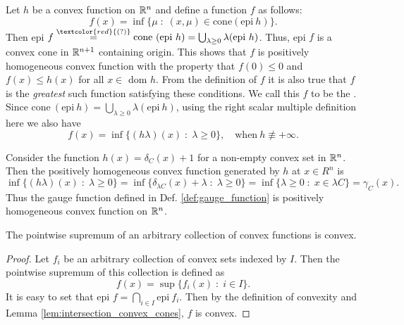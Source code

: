 \documentclass[11pt,a4paper]{article}
\begin{document}
\begin{remark}
    Let $h$ be a convex function on $\mathbb{R}^n$ and define a function $f$ as follows:
    \begin{equation*}
        f(x) = \inf \{\mu\;:\;(x,\mu)\in \mathrm{cone}(\mathrm{epi}\ h)\}.
    \end{equation*}
    Then epi $f \overset{\textcolor{red}{(?)}}{=} \mathrm{cone}\ (\mathrm{epi}\ h) = \bigcup_{\lambda\ge 0} \lambda (\mathrm{epi}\ h)$. Thus, epi $f$ is a convex cone in $\mathbb{R}^{n+1}$ containing origin. This shows that $f$ is positively homogeneous convex function with the property that $f(0)\le 0$ and $f(x)\le h(x)$ for all $x\in$ dom $h$. From the definition of $f$ it is also true that $f$ is the \textit{greatest} such function satisfying these conditions. We call this $f$ to be the . Since $\mathrm{cone}\ (\mathrm{epi}\ h) = \bigcup_{\lambda\ge 0} \lambda (\mathrm{epi}\ h)$, using the right scalar multiple definition here we also have
    \begin{equation*}
        f(x) = \inf\{(h\lambda)(x)\;:\;\lambda\ge 0\},\quad\text{when}\ h\not\equiv +\infty.
    \end{equation*}

    \noindent Consider the function $h(x) = \delta_C(x)+1$ for a non-empty convex set in $\mathbb{R}^n$. Then the positively homogeneous convex function generated by $h$ at $x\in R^n$ is 
    \begin{equation*}
        \inf\{(h\lambda)(x)\;:\;\lambda\ge 0\} = \inf \{\delta_{\lambda C}(x)+\lambda\;:\; \lambda\ge 0\} = \inf\{\lambda\ge 0\;:\; x\in \lambda C\} = \gamma_C(x).
    \end{equation*}
    Thus the gauge function defined in Def. \ref{def:gauge_function} is positively homogeneous convex function on $\mathbb{R}^n$.
\end{remark}

\begin{theorem}\label{thm:pointwise_sup}
    The pointwise supremum of an arbitrary collection of convex functions is convex.
\end{theorem}

\begin{proof}
    Let $f_i$ be an arbitrary collection of convex sets indexed by $I$. Then the pointwise supremum of this collection is defined as
    \begin{equation*}
        f(x) = \sup \{f_i(x)\;:\; i\in I\}.
    \end{equation*}
    It is easy to set that epi $f = \bigcap_{i\in I} \mathrm{epi}\ f_i$. Then by the definition of convexity and Lemma \ref{lem:intersection_convex_cones}, $f$ is convex.
\end{proof}
\end{document}
